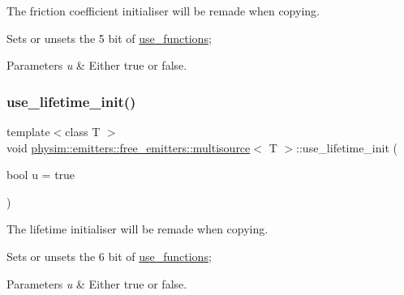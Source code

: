 The friction coefficient initialiser will be remade when copying. 

Sets or unsets the 5 bit of \hyperlink{classphysim_1_1emitters_1_1free__emitters_1_1multisource_a99bad5ac0fb5cb14652bbfd0c1f0eeff}{use\+\_\+functions}; 
\begin{DoxyParams}{Parameters}
{\em u} & Either true or false. \\
\hline
\end{DoxyParams}
\mbox{\label{classphysim_1_1emitters_1_1free__emitters_1_1multisource_a1e2a1b53db17d53177706d6d46884a59}} 
\subsubsection{\texorpdfstring{use\+\_\+lifetime\+\_\+init()}{use\_lifetime\_init()}}
{\footnotesize\ttfamily template$<$class T $>$ \\
void \hyperlink{classphysim_1_1emitters_1_1free__emitters_1_1multisource}{physim\+::emitters\+::free\+\_\+emitters\+::multisource}$<$ T $>$\+::use\+\_\+lifetime\+\_\+init (\begin{DoxyParamCaption}\item[{bool}]{u = {\ttfamily true} }\end{DoxyParamCaption})}



The lifetime initialiser will be remade when copying. 

Sets or unsets the 6 bit of \hyperlink{classphysim_1_1emitters_1_1free__emitters_1_1multisource_a99bad5ac0fb5cb14652bbfd0c1f0eeff}{use\+\_\+functions}; 
\begin{DoxyParams}{Parameters}
{\em u} & Either true or false. \\
\hline
\end{DoxyParams}
\mbox{\label{classphysim_1_1emitters_1_1free__emitters_1_1multisource_a7fb61c1618b2e22f8afd953d065b52b8}} 
